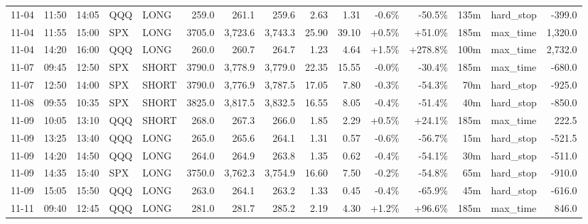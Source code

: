 \documentclass[11pt,a4paper,twoside]{article}
\begin{document}
\begin{landscape}
\begin{center}
\begin{longtable}{>{\color{txtmain}}l l l l l r r r r r r r r >{\color{txtmain}}l r}
11-04 & 11:50 & 14:05 & QQQ & LONG & 259.0 & 261.1 & 259.6 & 2.63 & 1.31 & \textcolor{lossred}{-0.6\%} & \textcolor{lossred}{-50.5\%} & 135m & hard\_stop & \textcolor{lossred}{-399.0} \\
11-04 & 11:55 & 15:00 & SPX & LONG & 3705.0 & 3,723.6 & 3,743.3 & 25.90 & 39.10 & \textcolor{wingreen}{+0.5\%} & \textcolor{wingreen}{+51.0\%} & 185m & max\_time & \textcolor{wingreen}{1,320.0} \\
11-04 & 14:20 & 16:00 & QQQ & LONG & 260.0 & 260.7 & 264.7 & 1.23 & 4.64 & \textcolor{wingreen}{+1.5\%} & \textcolor{wingreen}{+278.8\%} & 100m & max\_time & \textcolor{wingreen}{2,732.0} \\
11-07 & 09:45 & 12:50 & SPX & SHORT & 3790.0 & 3,778.9 & 3,779.0 & 22.35 & 15.55 & \textcolor{lossred}{-0.0\%} & \textcolor{lossred}{-30.4\%} & 185m & max\_time & \textcolor{lossred}{-680.0} \\
11-07 & 12:50 & 14:00 & SPX & SHORT & 3790.0 & 3,776.9 & 3,787.5 & 17.05 & 7.80 & \textcolor{lossred}{-0.3\%} & \textcolor{lossred}{-54.3\%} & 70m & hard\_stop & \textcolor{lossred}{-925.0} \\
11-08 & 09:55 & 10:35 & SPX & SHORT & 3825.0 & 3,817.5 & 3,832.5 & 16.55 & 8.05 & \textcolor{lossred}{-0.4\%} & \textcolor{lossred}{-51.4\%} & 40m & hard\_stop & \textcolor{lossred}{-850.0} \\
11-09 & 10:05 & 13:10 & QQQ & SHORT & 268.0 & 267.3 & 266.0 & 1.85 & 2.29 & \textcolor{wingreen}{+0.5\%} & \textcolor{wingreen}{+24.1\%} & 185m & max\_time & \textcolor{wingreen}{222.5} \\
11-09 & 13:25 & 13:40 & QQQ & LONG & 265.0 & 265.6 & 264.1 & 1.31 & 0.57 & \textcolor{lossred}{-0.6\%} & \textcolor{lossred}{-56.7\%} & 15m & hard\_stop & \textcolor{lossred}{-521.5} \\
11-09 & 14:20 & 14:50 & QQQ & LONG & 264.0 & 264.9 & 263.8 & 1.35 & 0.62 & \textcolor{lossred}{-0.4\%} & \textcolor{lossred}{-54.1\%} & 30m & hard\_stop & \textcolor{lossred}{-511.0} \\
11-09 & 14:35 & 15:40 & SPX & LONG & 3750.0 & 3,762.3 & 3,754.9 & 16.60 & 7.50 & \textcolor{lossred}{-0.2\%} & \textcolor{lossred}{-54.8\%} & 65m & hard\_stop & \textcolor{lossred}{-910.0} \\
11-09 & 15:05 & 15:50 & QQQ & LONG & 263.0 & 264.1 & 263.2 & 1.33 & 0.45 & \textcolor{lossred}{-0.4\%} & \textcolor{lossred}{-65.9\%} & 45m & hard\_stop & \textcolor{lossred}{-616.0} \\
11-11 & 09:40 & 12:45 & QQQ & LONG & 281.0 & 281.7 & 285.2 & 2.19 & 4.30 & \textcolor{wingreen}{+1.2\%} & \textcolor{wingreen}{+96.6\%} & 185m & max\_time & \textcolor{wingreen}{846.0} \\

\end{longtable}
\end{center}
\end{landscape}
\end{document}
